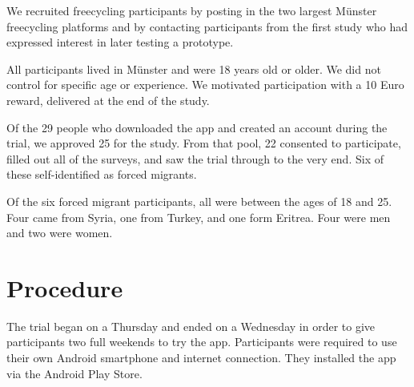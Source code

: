 We recruited freecycling participants by posting in the two largest Münster freecycling platforms and by contacting participants from the first study who had expressed interest in later testing a prototype.

All participants lived in Münster and were 18 years old or older. We did not control for specific age or experience. We motivated participation with a 10 Euro reward, delivered at the end of the study.

Of the 29 people who downloaded the app and created an account during the trial, we approved 25 for the study. From that pool, 22 consented to participate, filled out all of the surveys, and saw the trial through to the very end. Six of these self-identified as forced migrants.

Of the six forced migrant participants, all were between the ages of 18 and 25. Four came from Syria, one from Turkey, and one form Eritrea. Four were men and two were women.


\section{Procedure}

The trial began on a Thursday and ended on a Wednesday in order to give participants two full weekends to try the app. Participants were required to use their own Android smartphone and internet connection. They installed the app via the Android Play Store.

